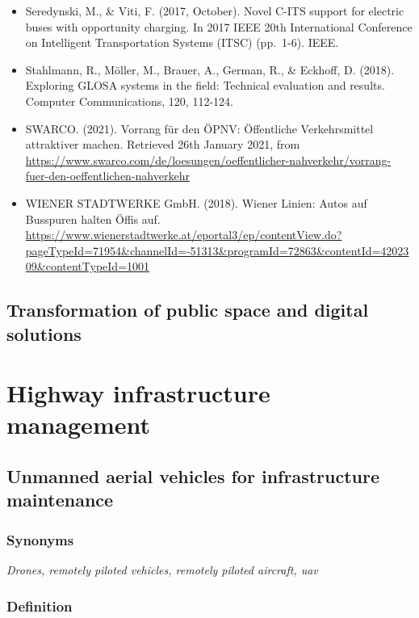 \documentclass[
]{book}
\begin{document}
\begin{itemize}
\item
  Seredynski, M., \& Viti, F. (2017, October). Novel C-ITS support for electric buses with opportunity charging. In 2017 IEEE 20th International Conference on Intelligent Transportation Systems (ITSC) (pp.~1-6). IEEE.
\item
  Stahlmann, R., Möller, M., Brauer, A., German, R., \& Eckhoff, D. (2018). Exploring GLOSA systems in the field: Technical evaluation and results. Computer Communications, 120, 112-124.
\item
  SWARCO. (2021). Vorrang für den ÖPNV: Öffentliche Verkehrsmittel attraktiver machen. Retrieved 26th January 2021, from \url{https://www.swarco.com/de/loesungen/oeffentlicher-nahverkehr/vorrang-fuer-den-oeffentlichen-nahverkehr}
\item
  WIENER STADTWERKE GmbH. (2018). Wiener Linien: Autos auf Busspuren halten Öffis auf. \url{https://www.wienerstadtwerke.at/eportal3/ep/contentView.do?pageTypeId=71954\&channelId=-51313\&programId=72863\&contentId=4202309\&contentTypeId=1001}
\end{itemize}

\hypertarget{transformation_public_space}{%
\section{Transformation of public space and digital solutions}\label{transformation_public_space}}

\hypertarget{highway}{%
\chapter{Highway infrastructure management}\label{highway}}

\hypertarget{uav}{%
\section{Unmanned aerial vehicles for infrastructure maintenance}\label{uav}}

\hypertarget{synonyms-3}{%
\subsection*{Synonyms}\label{synonyms-3}}

\emph{Drones, remotely piloted vehicles, remotely piloted aircraft, uav}

\hypertarget{definition-3}{%
\subsection*{Definition}\label{definition-3}}
\end{document}
